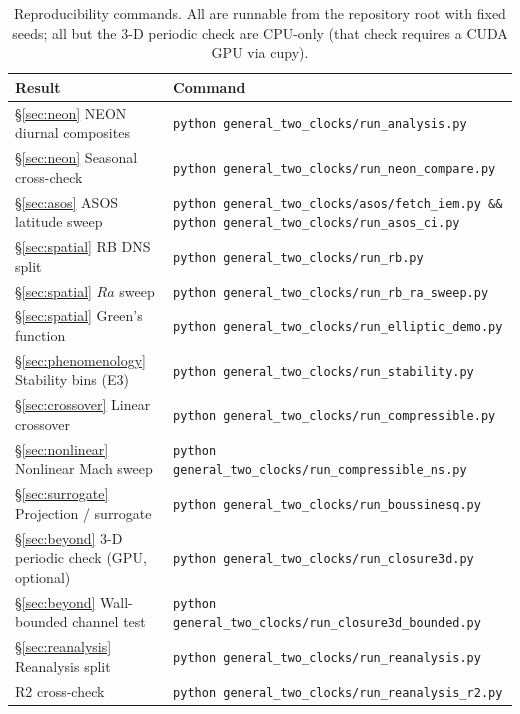 \documentclass[aps,prfluids,preprint,superscriptaddress,nofootinbib]{revtex4-2}
\begin{document}
\begin{table}
\centering
\caption{Reproducibility commands. All are runnable from the repository root with fixed seeds; all but the 3-D periodic check are CPU-only (that check requires a CUDA GPU via cupy).}
\label{tab:commands}
\small
\begin{tabular}{p{}p{}}
\toprule
Result & Command \\
\midrule
\S\ref{sec:neon} NEON diurnal composites &
\texttt{python general\_two\_clocks/\allowbreak run\_analysis.py} \\
\S\ref{sec:neon} Seasonal cross-check &
\texttt{python general\_two\_clocks/\allowbreak run\_neon\_compare.py} \\
\S\ref{sec:asos} ASOS latitude sweep &
\texttt{python general\_two\_clocks/asos/\allowbreak fetch\_iem.py \&\&
python general\_two\_clocks/\allowbreak run\_asos\_ci.py} \\
\S\ref{sec:spatial} RB DNS split &
\texttt{python general\_two\_clocks/\allowbreak run\_rb.py} \\
\S\ref{sec:spatial} $Ra$ sweep &
\texttt{python general\_two\_clocks/\allowbreak run\_rb\_ra\_sweep.py} \\
\S\ref{sec:spatial} Green's function &
\texttt{python general\_two\_clocks/\allowbreak run\_elliptic\_demo.py} \\
\S\ref{sec:phenomenology} Stability bins (E3) &
\texttt{python general\_two\_clocks/\allowbreak run\_stability.py} \\
\S\ref{sec:crossover} Linear crossover &
\texttt{python general\_two\_clocks/\allowbreak run\_compressible.py} \\
\S\ref{sec:nonlinear} Nonlinear Mach sweep &
\texttt{python general\_two\_clocks/\allowbreak run\_compressible\_ns.py} \\
\S\ref{sec:surrogate} Projection / surrogate &
\texttt{python general\_two\_clocks/\allowbreak run\_boussinesq.py} \\
\S\ref{sec:beyond} 3-D periodic check (GPU, optional) &
\texttt{python general\_two\_clocks/\allowbreak run\_closure3d.py} \\
\S\ref{sec:beyond} Wall-bounded channel test &
\texttt{python general\_two\_clocks/\allowbreak run\_closure3d\_bounded.py} \\
\S\ref{sec:reanalysis} Reanalysis split &
\texttt{python general\_two\_clocks/\allowbreak run\_reanalysis.py} \\
R2 cross-check &
\texttt{python general\_two\_clocks/\allowbreak run\_reanalysis\_r2.py} \\
\bottomrule
\end{tabular}
\end{table}
\end{document}
